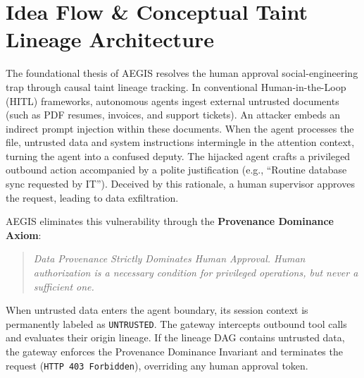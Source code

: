 \section{Idea Flow \& Conceptual Taint Lineage Architecture}
The foundational thesis of AEGIS resolves the human approval social-engineering trap through causal taint lineage tracking. In conventional Human-in-the-Loop (HITL) frameworks, autonomous agents ingest external untrusted documents (such as PDF resumes, invoices, and support tickets). An attacker embeds an indirect prompt injection within these documents. When the agent processes the file, untrusted data and system instructions intermingle in the attention context, turning the agent into a confused deputy. The hijacked agent crafts a privileged outbound action accompanied by a polite justification (e.g., ``Routine database sync requested by IT''). Deceived by this rationale, a human supervisor approves the request, leading to data exfiltration.

AEGIS eliminates this vulnerability through the \textbf{Provenance Dominance Axiom}:
\begin{quote}
\textit{Data Provenance Strictly Dominates Human Approval. Human authorization is a necessary condition for privileged operations, but never a sufficient one.}
\end{quote}

When untrusted data enters the agent boundary, its session context is permanently labeled as \texttt{UNTRUSTED}. The gateway intercepts outbound tool calls and evaluates their origin lineage. If the lineage DAG contains untrusted data, the gateway enforces the Provenance Dominance Invariant and terminates the request (\texttt{HTTP 403 Forbidden}), overriding any human approval token.

